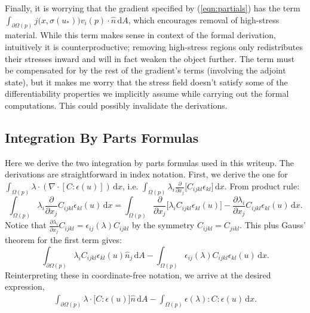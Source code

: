 \documentclass[10pt]{article}
\renewcommand{\div}{\nabla \cdot}
\providecommand{\shape}{\Omega(p)}
\providecommand{\boundary}{\partial \shape}
\providecommand{\vint}[1]{\int_{\shape} \! #1 \, \mathrm{d}x}
\providecommand{\sint}[1]{\int_{\boundary} \! #1 \, \mathrm{d}A}
\providecommand{\pder}[2]{\frac{\partial #1}{\partial #2}}
\begin{document}
Finally, it is worrying that the gradient specified by (\ref{eqn:partials}) has
the term $\sint{j\big(x, \sigma(u_*)\big) v_i(p) \cdot \hat{n}}$, which encourages
removal of high-stress material. While this term makes sense in context of the
formal derivation, intuitively it is counterproductive; removing high-stress
regions only redistributes their stresses inward and will in fact weaken the
object further. The term must be compensated for by the rest of the gradient's
terms (involving the adjoint state), but it makes me worry that the stress
field doesn't satisfy some of the differentiability properties we implicitly
assume while carrying out the formal computations. This could possibly
invalidate the derivations.

\begin{appendices}
    \section{Integration By Parts Formulas}
    \label{sec:IBP}
    Here we derive the two integration by parts formulas used in this writeup. The
    derivations are straightforward in index notation. First, we derive the one
    for
    $
    \vint{\lambda \cdot \left(\div \left[ C:\epsilon(u)\right]\right)}
    $, i.e. $ \vint{\lambda_i \pder{}{x_j}\big[C_{ijkl} \epsilon_{kl}\big]}. $
    From product rule:
    $$
    \vint{\lambda_i \pder{}{x_j}C_{ijkl} \epsilon_{kl}(u)} =
    \vint{\pder{}{x_j} \big[\lambda_i C_{ijkl} \epsilon_{kl}(u)\big] -
    \pder{\lambda_i}{x_j} C_{ijkl} \epsilon_{kl}(u)}.
    $$
    Notice that $\pder{\lambda_i}{x_j} C_{ijkl} = \epsilon_{ij}(\lambda) C_{ijkl}$ by
    the symmetry $C_{ijkl} = C_{jikl}$. This plus Gauss' theorem for the first
    term gives:
    $$
    \sint{\lambda_i C_{ijkl} \epsilon_{kl}(u)\hat{n}_j} -
    \vint{\epsilon_{ij}(\lambda)C_{ijkl} \epsilon_{kl}(u)}.
    $$
    Reinterpreting these in coordinate-free notation, we arrive at the desired expression,
    \begin{align}
    \sint{\lambda \cdot \big[C : \epsilon(u) \big]\hat{n}} - \vint{\epsilon(\lambda) : C : \epsilon(u)}.
    \label{eqn:IBP_1}
    \end{align}


\end{appendices}
\end{document}
